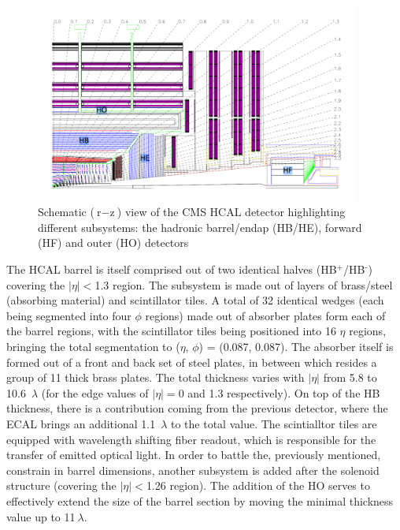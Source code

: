 \begin{figure}[htbp]
  \centering
    \includegraphics[width=0.95\textwidth]{CMS_experiment/HCAL_structure.png}
  \caption[Schematic ($\text{r}-\text{z}$) view of the CMS HCAL detector highlighting different subsystems: the hadronic barrel/endap (HB/HE), forward (HF) and outer (HO) detectors.]{Schematic ($\text{r}-\text{z}$) view of the CMS HCAL detector highlighting different subsystems: the hadronic barrel/endap (HB/HE), forward (HF) and outer (HO) detectors~\cite{cms:paper}}
  \label{fig:hcal}
\end{figure}

\hspace{10pt} The HCAL barrel is itself comprised out of two identical halves (HB$^{\text{+}}$/HB$^{\text{-}}$) covering the $|\eta|<$1.3 region. The subsystem is made out of layers of brass/steel (absorbing material) and scintillator tiles. A total of 32 identical wedges (each being segmented into four $\phi$ regions) made out of absorber plates form each of the barrel regions, with the scintillator tiles being positioned into 16 $\eta$ regions, bringing the total segmentation to ($\eta$, $\phi$) = (0.087, 0.087). The absorber itself is formed out of a front and back set of steel plates, in between which resides a group of 11 thick brass plates. The total thickness varies with $|\eta|$ from 5.8 to 10.6~$\lambda$ (for the edge values of $|\eta|=$0 and 1.3 respectively). On top of the HB thickness, there is a contribution coming from the previous detector, where the ECAL brings an additional 1.1~$\lambda$ to the total value. The scintialltor tiles are equipped with wavelength shifting fiber readout, which is responsible for the transfer of emitted optical light. In order to battle the, previously mentioned, constrain in barrel dimensions, another subsystem is added after the solenoid structure (covering the $|\eta|<$1.26 region). The addition of the HO serves to effectively extend the size of the barrel section by moving the minimal thickness value up to 11$~\lambda$.

